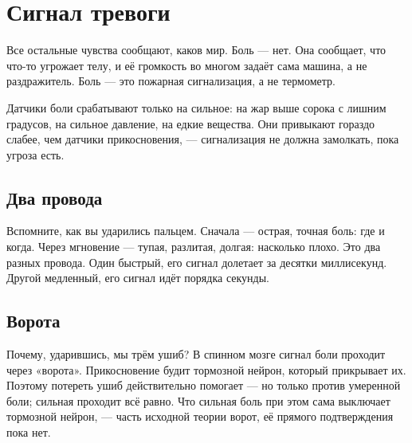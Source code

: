 \chapter{Сигнал тревоги}


Все остальные чувства сообщают, каков мир. Боль --- нет. Она сообщает, что что-то угрожает телу, и её громкость во многом задаёт сама машина, а не раздражитель. Боль --- это пожарная сигнализация, а не термометр.

Датчики боли срабатывают только на сильное: на жар выше сорока с лишним градусов, на сильное давление, на едкие вещества. Они привыкают гораздо слабее, чем датчики прикосновения, --- сигнализация не должна замолкать, пока угроза есть.

\section*{Два провода}

Вспомните, как вы ударились пальцем. Сначала --- острая, точная боль: где и когда. Через мгновение --- тупая, разлитая, долгая: насколько плохо. Это два разных провода. Один быстрый, его сигнал долетает за десятки миллисекунд. Другой медленный, его сигнал идёт порядка секунды.

\section*{Ворота}

Почему, ударившись, мы трём ушиб? В спинном мозге сигнал боли проходит через «ворота». Прикосновение будит тормозной нейрон, который прикрывает их. Поэтому потереть ушиб действительно помогает --- но только против умеренной боли; сильная проходит всё равно. Что сильная боль при этом сама выключает тормозной нейрон, --- часть исходной теории ворот, её прямого подтверждения пока нет.


